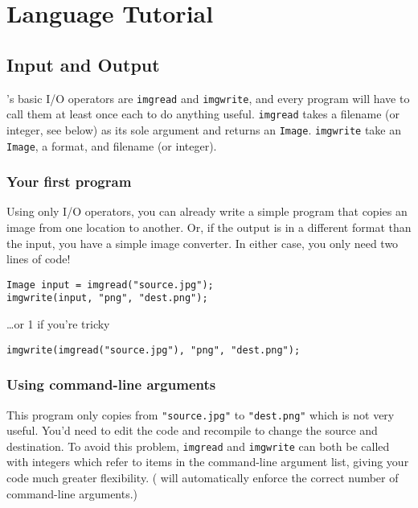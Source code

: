\chapter{Language Tutorial}

\section{Input and Output}

\sys{}'s basic I/O operators are \texttt{imgread} and \texttt{imgwrite}, and every program
will have to call them at least once each to do anything useful. \texttt{imgread}
takes a filename (or integer, see below) as its sole argument and returns an \texttt{Image}.
\texttt{imgwrite} take an \texttt{Image}, a format, and filename (or integer).

\subsection{Your first program}

Using only I/O operators, you can already write a simple program that copies an image from
one location to another. Or, if the output is in a different format than the input,
you have a simple image converter. In either case, you only need two lines of code!

\begin{lstlisting}[language=CLAM,escapechar=\%]
Image input = imgread("source.jpg");
imgwrite(input, "png", "dest.png");
\end{lstlisting}
\ldots or 1 if you're tricky
\begin{lstlisting}[language=CLAM,escapechar=\%]
imgwrite(imgread("source.jpg"), "png", "dest.png");
\end{lstlisting}

\subsection{Using command-line arguments}

This program only copies from \texttt{"source.jpg"} to \texttt{"dest.png"} which is not
very useful.
You'd need to edit the code and recompile to change the source and destination.
To avoid this problem, \texttt{imgread} and \texttt{imgwrite} can both be called with integers
which refer to items in the command-line argument list, giving your code much greater
flexibility. (\sys{} will automatically enforce the correct number of command-line arguments.)


